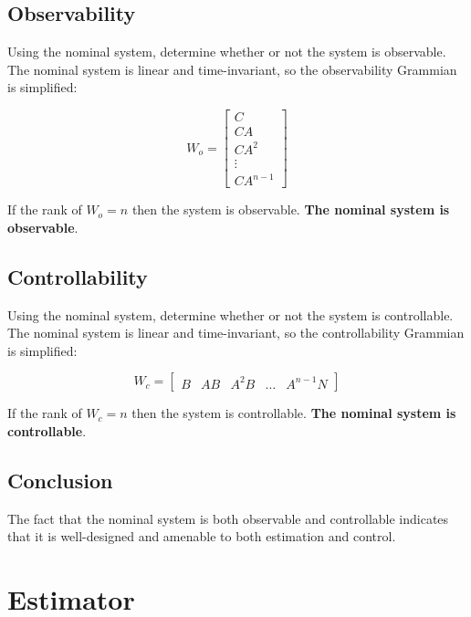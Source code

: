 \documentclass[12pt,onecolumn,reqno]{amsart}
\begin{document}
\subsection{Observability}
Using the nominal system, determine whether or not the system is observable. The
nominal system is linear and time-invariant, so the observability Grammian is
simplified:

\begin{equation}
  W_{o} = 
  \begin{bmatrix}
    C      \\
    CA     \\
    CA^2   \\
    \vdots \\
    CA^{n-1}
  \end{bmatrix}
\end{equation}

If the rank of $W_{o} = n$ then the system is observable. \textbf{The nominal
system is observable}.


\subsection{Controllability}
Using the nominal system, determine whether or not the system is controllable. The
nominal system is linear and time-invariant, so the controllability Grammian is
simplified:

\begin{equation}
  W_{c} = 
  \begin{bmatrix}
    B & AB & A^2B & \hdots & A^{n-1}N
  \end{bmatrix}
\end{equation}

If the rank of $W_{c} = n$ then the system is controllable. \textbf{The nominal
system is controllable}.

\subsection{Conclusion}
The fact that the nominal system is both observable and controllable indicates
that it is well-designed and amenable to both estimation and control.


\section{Estimator} \label{sec:kalman_filter}
\end{document}
